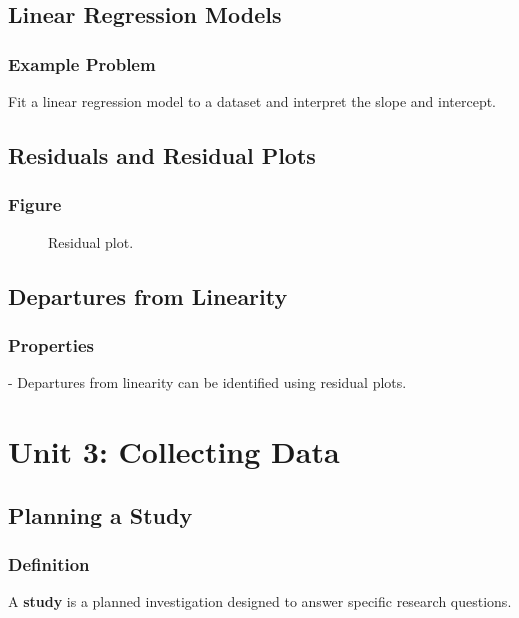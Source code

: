 \subsection{Linear Regression Models}
\subsubsection{Example Problem}
\begin{example}
Fit a linear regression model to a dataset and interpret the slope and intercept.
\end{example}

\subsection{Residuals and Residual Plots}
\subsubsection{Figure}
\begin{figure}[h!]
\centering
\caption{Residual plot.}
\end{figure}

\subsection{Departures from Linearity}
\subsubsection{Properties}
\begin{properties}
- Departures from linearity can be identified using residual plots.
\end{properties}

\section{Unit 3: Collecting Data}
\subsection{Planning a Study}
\subsubsection{Definition}
\begin{definition}
A \textbf{study} is a planned investigation designed to answer specific research questions.
\end{definition}

